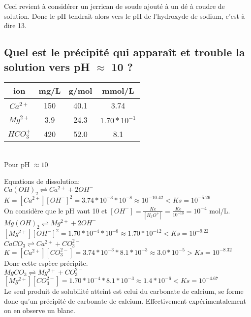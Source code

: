 \documentclass{scrartcl}
\begin{document}
			Ceci revient à considérer un jerrican de soude ajouté à un dé à coudre de solution. Donc le pH tendrait alors vers le pH de l'hydroxyde de sodium, c'est-à-dire 13.
			
		\subsection{Quel est le précipité qui apparaît et trouble la solution vers pH $\approx$ 10 ?}
		
		\begin{tabular}{|c|c|c|c|}
				\hline ion & mg/L & g/mol & mmol/L\\
				\hline $Ca^{2+}$ & 150 & 40.1 & 3.74\\
				\hline $Mg^{2+}$ & 3.9 & 24.3 & $1.70 * 10^{-1}$\\
				\hline $HCO_3^+$ & 420 & 52.0 & 8.1\\
				\hline
		\end{tabular}\\
				
		Pour pH $\approx 10$
				
		Equations de dissolution:\\
	
		$Ca(OH)_2 \rightleftharpoons Ca^{2+} + 2OH^-$\\
		$K = [Ca^{2+}][OH^-]^2 = 3.74 * 10^{-3} * 10^{-8} \approx 10^{-10.42} < Ks = 10^{-5.26}$\\
		On considère que le pH vaut 10 et $[OH^-] = \frac{Ke}{[H_3O^+]} = \frac{Ke}{10^{-10}} = 10^{-4}$ mol/L.\\
		
		$Mg(OH)_2 \rightleftharpoons Mg^{2+} + 2OH^-$\\
		$[Mg^{2+}][OH^-]^2 = 1.70 * 10^{-4} * 10^{-8} \approx 1.70 * 10^{-12} < Ks = 10^{-9.22}$\\
		
		$CaCO_3 \rightleftharpoons Ca^{2+} + CO_3^{2-}$\\
		$K = [Ca^{2+}][CO_3^{2-}] = 3.74 * 10^{-3} * 8.1 * 10^{-3} \approx 3.0 * 10^{-5} > Ks = 10^{-8.32}$\\
		Donc cette espèce précipite.\\
		
		$MgCO_3 \rightleftharpoons Mg^{2+} + CO_3^{2-}$\\
		$[Mg^{2+}][CO_3^{2-}] = 1.70 * 10^{-4} * 8.1 * 10^{-3} \approx 1.4 * 10^{-6} < Ks = 10^{-4.67}$\\
		
		Le seul produit de solubilité atteint est celui du carbonate de calcium, se forme donc qu'un précipité de carbonate de calcium. Effectivement expérimentalement on en observe un blanc.
		
\end{document}

